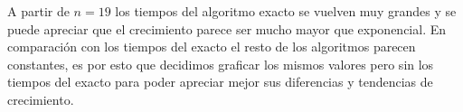 \begin{figure}[H]
    \begin{minipage}[t]{\linewidth}
		\centering
		\label{fig:ejercicio-6-comparacion-tiempos}
    \end{minipage}
\end{figure}
A partir de $n=19$ los tiempos del algoritmo exacto se vuelven muy grandes y se puede apreciar
que el crecimiento parece ser mucho mayor que exponencial. En comparación con los tiempos del exacto
el resto de los algoritmos parecen constantes, es por esto que decidimos graficar los mismos valores 
pero sin los tiempos del exacto para poder apreciar mejor sus diferencias y tendencias de crecimiento.
\begin{figure}[H]
    \begin{minipage}[t]{\linewidth}
		\centering
		\label{fig:ejercicio-6-comparacion-tiempos-menos-exacto}
    \end{minipage}
\end{figure}
